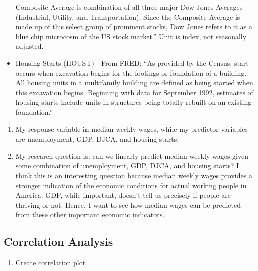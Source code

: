 \documentclass[
]{article}
\providecommand{\tightlist}{%
  \setlength{\itemsep}{0pt}\setlength{\parskip}{0pt}}
\begin{document}
\begin{itemize}
  Composite Average is combination of all three major Dow Jones Averages
  (Industrial, Utility, and Transportation). Since the Composite Average
  is made up of this select group of prominent stocks, Dow Jones refers
  to it as a blue chip microcosm of the US stock market.'' Unit is
  index, not seasonally adjusted.
\item
  Housing Starts (HOUST) - From FRED: ``As provided by the Census, start
  occurs when excavation begins for the footings or foundation of a
  building. All housing units in a multifamily building are defined as
  being started when this excavation begins. Beginning with data for
  September 1992, estimates of housing starts include units in
  structures being totally rebuilt on an existing foundation.''
\end{itemize}

\begin{enumerate}
\def\labelenumi{\arabic{enumi}.}
\setcounter{enumi}{1}
\item
  My response variable in median weekly wages, while my predictor
  variables are unemployment, GDP, DJCA, and housing starts.
\item
  My research question is: can we linearly predict median weekly wages
  given some combination of unemployment, GDP, DJCA, and housing starts?
  I think this is an interesting question because median weekly wages
  provides a stronger indication of the economic conditions for actual
  working people in America. GDP, while important, doesn't tell us
  precisely if people are thriving or not. Hence, I want to see how
  median wages can be predicted from these other important economic
  indicators.
\end{enumerate}

\hypertarget{correlation-analysis}{%
\subsection{Correlation Analysis}\label{correlation-analysis}}

\begin{enumerate}
\def\labelenumi{\arabic{enumi}.}
\tightlist
\item
  Create correlation plot.
\end{enumerate}
\end{document}
